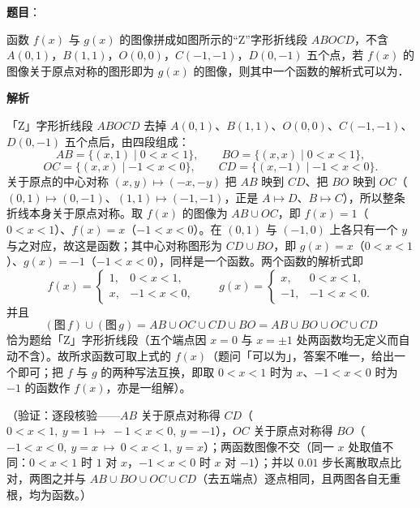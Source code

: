 \begin{answer}

\textbf{题目}：

函数 \(f(x)\) 与 \(g(x)\) 的图像拼成如图所示的“Z”字形折线段 \(ABOCD\)，不含 \(A(0,1)\)，\(B(1,1)\)，\(O(0,0)\)，\(C(-1,-1)\)，\(D(0,-1)\) 五个点，若 \(f(x)\) 的图像关于原点对称的图形即为 \(g(x)\) 的图像，则其中一个函数的解析式可以为\gkblank{}．
\nopagebreak[4]
\begin{center}\end{center}
\nopagebreak[4]
\textbf{解析}

「Z」字形折线段 \(ABOCD\) 去掉 \(A(0,1)\)、\(B(1,1)\)、\(O(0,0)\)、\(C(-1,-1)\)、\(D(0,-1)\) 五个点后，由四段组成：
\nopagebreak[4]
\[
AB=\{(x,1)\mid0<x<1\},\qquad BO=\{(x,x)\mid0<x<1\},
\]
\nopagebreak[4]
\[
OC=\{(x,x)\mid-1<x<0\},\qquad CD=\{(x,-1)\mid-1<x<0\}.
\]
关于原点的中心对称 \((x,y)\mapsto(-x,-y)\) 把 \(AB\) 映到 \(CD\)、把 \(BO\) 映到 \(OC\)（\((0,1)\mapsto(0,-1)\)、\((1,1)\mapsto(-1,-1)\)，正是 \(A\mapsto D\)、\(B\mapsto C\)），所以整条折线本身关于原点对称。取 \(f(x)\) 的图像为 \(AB\cup OC\)，即 \(f(x)=1\)（\(0<x<1\)）、\(f(x)=x\)（\(-1<x<0\)）。在 \((0,1)\) 与 \((-1,0)\) 上各只有一个 \(y\) 与之对应，故这是函数；其中心对称图形为 \(CD\cup BO\)，即 \(g(x)=x\)（\(0<x<1\)）、\(g(x)=-1\)（\(-1<x<0\)），同样是一个函数。两个函数的解析式即
\nopagebreak[4]
\[
f(x)=\begin{cases}1,&0<x<1,\\[2pt] x,&-1<x<0,\end{cases}\qquad g(x)=\begin{cases}x,&0<x<1,\\[2pt] -1,&-1<x<0.\end{cases}
\]
并且
\nopagebreak[4]
\[
(\text{图}\,f)\cup(\text{图}\,g)=AB\cup OC\cup CD\cup BO=AB\cup BO\cup OC\cup CD
\]
恰为题给「Z」字形折线段（五个端点因 \(x=0\) 与 \(x=\pm1\) 处两函数均无定义而自动不含）。故所求函数可取上式的 \(f(x)\)（题问「可以为」，答案不唯一，给出一个即可；把 \(f\) 与 \(g\) 的两种写法互换，即取 \(0<x<1\) 时为 \(x\)、\(-1<x<0\) 时为 \(-1\) 的函数作 \(f(x)\)，亦是一组解）。

（验证：逐段核验——\(AB\) 关于原点对称得 \(CD\)（\(0<x<1,\ y=1\ \mapsto\ -1<x<0,\ y=-1\)），\(OC\) 关于原点对称得 \(BO\)（\(-1<x<0,\ y=x\ \mapsto\ 0<x<1,\ y=x\)）；两函数图像不交（同一 \(x\) 处取值不同：\(0<x<1\) 时 \(1\) 对 \(x\)，\(-1<x<0\) 时 \(x\) 对 \(-1\)）；并以 \(0.01\) 步长离散取点比对，两图之并与 \(AB\cup BO\cup OC\cup CD\)（去五端点）逐点相同，且两图各自无重根，均为函数。）


\end{answer}
